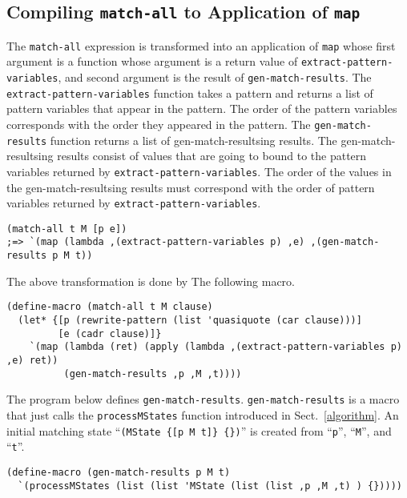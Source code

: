 \documentclass[acmlarge]{acmart}
\begin{document}
\subsection{Compiling \texttt{match-all} to Application of \texttt{map}}\label{method-map}

The \texttt{match-all} expression is transformed into an application of \texttt{map} whose first argument is a function whose argument is a return value of \texttt{extract-pattern-variables}, and second argument is the result of \texttt{gen-match-results}.
The \texttt{extract-pattern-variables} function takes a pattern and returns a list of pattern variables that appear in the pattern.
The order of the pattern variables corresponds with the order they appeared in the pattern.
The \texttt{gen-match-results} function returns a list of gen-match-resultsing results.
The gen-match-resultsing results consist of values that are going to bound to the pattern variables returned by \texttt{extract-pattern-variables}.
The order of the values in the gen-match-resultsing results must correspond with the order of pattern variables returned by \texttt{extract-pattern-variables}.

\begin{lstlisting}[language=egison]
(match-all t M [p e])
;=> `(map (lambda ,(extract-pattern-variables p) ,e) ,(gen-match-results p M t))
\end{lstlisting}

\noindent The above transformation is done by The following macro.

\begin{lstlisting}[language=egison]
(define-macro (match-all t M clause)
  (let* {[p (rewrite-pattern (list 'quasiquote (car clause)))]
         [e (cadr clause)]}
    `(map (lambda (ret) (apply (lambda ,(extract-pattern-variables p) ,e) ret))
          (gen-match-results ,p ,M ,t))))
\end{lstlisting}

\noindent The program below defines \texttt{gen-match-results}.
\texttt{gen-match-results} is a macro that just calls the \texttt{processMStates} function introduced in Sect.~\ref{algorithm}.
An initial matching state ``\verb|(MState {[p M t]} {})|'' is created from ``\texttt{p}'', ``\texttt{M}'', and ``\texttt{t}''.

\begin{lstlisting}[language=egison]
(define-macro (gen-match-results p M t)
  `(processMStates (list (list 'MState (list (list ,p ,M ,t) ) {}))))
\end{lstlisting}
\end{document}
